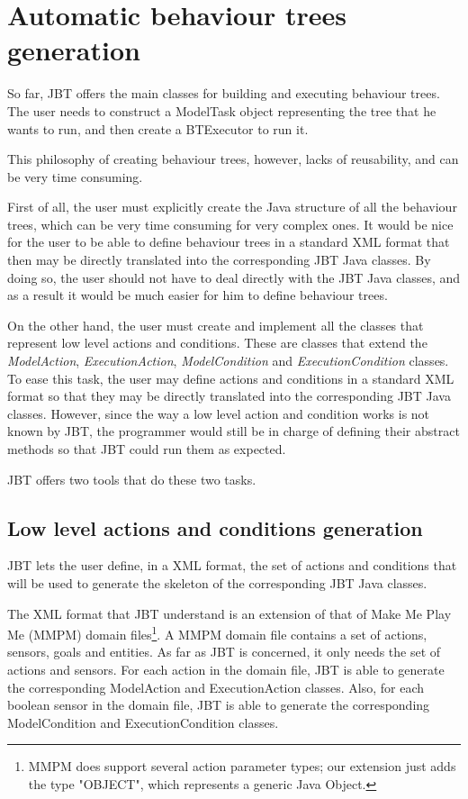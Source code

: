 \documentclass[a4paper,10pt]{article}
\begin{document}
\section{Automatic behaviour trees generation}

So far, JBT offers the main classes for building and executing behaviour trees. The user needs to construct a ModelTask object representing the tree that he wants to run, and then create a BTExecutor to run it.

This philosophy of creating behaviour trees, however, lacks of reusability, and can be very time consuming. 

First of all, the user must explicitly create the Java structure of all the behaviour trees, which can be very time consuming for very complex ones. It would be nice for the user to be able to define behaviour trees in a standard XML format that then may be directly translated into the corresponding JBT Java classes. By doing so, the user should not have to deal directly with the JBT Java classes, and as a result it would be much easier for him to define behaviour trees.

On the other hand, the user must create and implement all the classes that represent low level actions and conditions. These are classes that extend the \textit{ModelAction}, \textit{ExecutionAction}, \textit{ModelCondition} and \textit{ExecutionCondition} classes. To ease this task, the user may define actions and conditions in a standard XML format so that they may be directly translated into the corresponding JBT Java classes. However, since the way a low level action and condition works is not known by JBT, the programmer would still be in charge of defining their abstract methods so that JBT could run them as expected.

JBT offers two tools that do these two tasks.

\subsection{Low level actions and conditions generation}

JBT lets the user define, in a XML format, the set of actions and conditions that will be used to generate the skeleton of the corresponding JBT Java classes.

The XML format that JBT understand is an extension of that of Make Me Play Me (MMPM) domain files\footnote{MMPM does support several action parameter types; our extension just adds the type "OBJECT", which represents a generic Java Object.}. A MMPM domain file contains a set of actions, sensors, goals and entities. As far as JBT is concerned, it only needs the set of actions and sensors. For each action in the domain file, JBT is able to generate the corresponding ModelAction and ExecutionAction classes. Also, for each boolean sensor in the domain file, JBT is able to generate the corresponding ModelCondition and ExecutionCondition classes.
\end{document}
